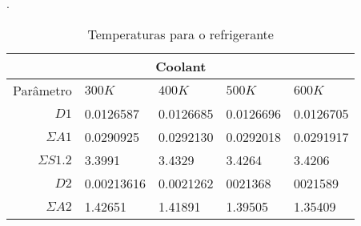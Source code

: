 \begin{table}[htb]
  \caption[Temperaturas para o refrigerante.]{Temperaturas para o refrigerante}.
  \label{tab-temp-coolant}
  \begin{tabular}{r l l l l}
    \multicolumn{5}{c}{Coolant} \\
    \hline
    Parâmetro & $300K$ & $400K$ & $500K$ & $600K$ \\
    \hline
    $D1$ & 0.0126587 & 0.0126685 & 0.0126696 & 0.0126705\\
    $\Sigma A1$ & 0.0290925 & 0.0292130 & 0.0292018 & 0.0291917\\
    $\Sigma S1.2$ & 3.3991 & 3.4329 & 3.4264 & 3.4206\\
    \hline
    $D2$ & 0.00213616 & 0.0021262 & 0021368 & 0021589\\
    $\Sigma A2$ & 1.42651 & 1.41891 & 1.39505 & 1.35409\\
    \hline
  \end{tabular}
\end{table}
